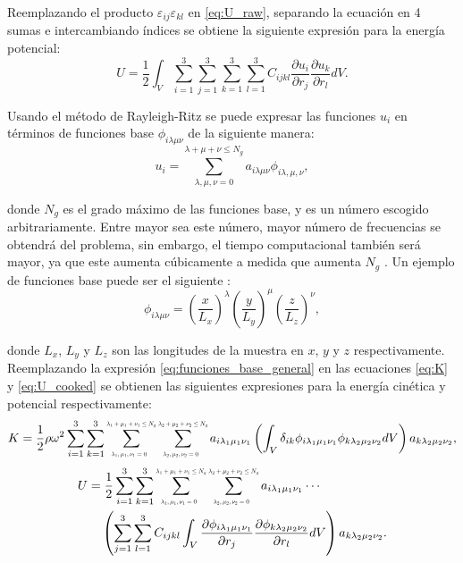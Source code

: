 \documentclass[12pt]{article}
\newcommand*{\Scale}[2][4]{\scalebox{#1}{$#2$}}%
\begin{document}
Reemplazando el producto $\varepsilon_{ij}\varepsilon_{kl}$ en \ref{eq:U_raw}, separando la ecuación en 4 sumas e intercambiando índices se obtiene la siguiente expresión para la energía potencial:
\begin{equation}
	U = \frac{1}{2} \int_{V}{\sum_{i=1}^{3}\sum_{j=1}^{3}\sum_{k=1}^{3}\sum_{l=1}^{3}{C_{ijkl}\frac{\partial u_i}{\partial r_j} \frac{\partial u_k}{\partial r_l}}dV}.
	\label{eq:U_cooked}
\end{equation}

Usando el método de Rayleigh-Ritz \cite{MIGLIORI19931} se puede expresar las funciones $u_i$ en términos de funciones base $\phi_{i \lambda \mu \nu}$ de la siguiente manera: 
\begin{equation}
	u_i = \sum_{\lambda,\mu,\nu=0}^{\lambda + \mu + \nu \le N_g}{a_{i\lambda\mu\nu} \phi_{i\lambda,\mu,\nu}},
	\label{eq:funciones_base_general}
\end{equation}

donde $N_g$ es el grado máximo de las funciones base, y es un número escogido arbitrariamente. Entre mayor sea este número, mayor número de frecuencias se obtendrá del problema, sin embargo, el tiempo computacional también será mayor, ya que este aumenta cúbicamente a medida que aumenta $N_g$ \cite{Leisure_1997}. Un ejemplo de funciones base puede ser el siguiente \cite{Demarest}:
\begin{equation}
    \phi_{i \lambda \mu \nu} = \left(\frac{x}{L_x} \right)^{\lambda} \left(\frac{y}{L_y} \right)^{\mu} \left(\frac{z}{L_z} \right)^{\nu},
	\label{eq:funciones_base_potencias}
\end{equation}

donde $L_x$, $L_y$ y $L_z$ son las longitudes de la muestra en $x$, $y$ y $z$ respectivamente. Reemplazando la expresión \ref{eq:funciones_base_general} en las ecuaciones \ref{eq:K} y \ref{eq:U_cooked} se obtienen las siguientes expresiones para la energía cinética y potencial respectivamente:
\begin{equation}
	K = \frac{1}{2} \rho \omega^2 \sum_{i=1}^{3}\sum_{k=1}^{3}\sum_{\Scale[0.5]{\lambda_1,\mu_1,\nu_1 = 0}}^{\Scale[0.5]{\lambda_1 + \mu_1 + \nu_1 \le N_g}} \sum_{\Scale[0.5]{\lambda_2,\mu_2,\nu_2 = 0}}^{\Scale[0.5]{\lambda_2 + \mu_2 + \nu_2 \le N_g}} {a_{i \lambda_1 \mu_1 \nu_1} \left(\int_{V} {\delta_{ik} \phi_{i \lambda_1 \mu_1 \nu_1} \phi_{k \lambda_2 \mu_2 \nu_2} dV} \right) a_{k \lambda_2 \mu_2 \nu_2}},
	\label{eq:K_final}
\end{equation}
\begin{align}
	U = &\;\frac{1}{2} \sum_{i=1}^{3}\sum_{k=1}^{3}\sum_{\Scale[0.5]{\lambda_1,\mu_1,\nu_1 = 0}}^{\Scale[0.5]{\lambda_1 + \mu_1 + \nu_1 \le N_g}} \sum_{\Scale[0.5]{\lambda_2,\mu_2,\nu_2 = 0}}^{\Scale[0.5]{\lambda_2 + \mu_2 + \nu_2 \le N_g}} a_{i \lambda_1 \mu_1 \nu_1} \cdots \nonumber \\ &\left(\sum_{j=1}^{3}\sum_{l=1}^{3} C_{ijkl}\int_{V} { \frac{\partial \phi_{i \lambda_1 \mu_1 \nu_1}}{\partial r_j} \frac{\partial \phi_{k \lambda_2 \mu_2 \nu_2}}{\partial r_l} dV} \right) a_{k \lambda_2 \mu_2 \nu_2}.
	\label{eq:U_final}
\end{align}
\end{document}
